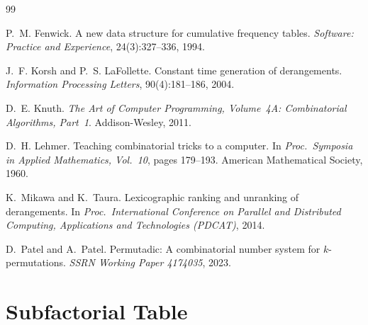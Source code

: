 \documentclass[11pt,a4paper]{article}
\begin{document}
    
    \begin{thebibliography}{99}

        P.~M. Fenwick.
        \newblock A new data structure for cumulative frequency tables.
        \newblock \emph{Software: Practice and Experience}, 24(3):327--336, 1994.

        J.~F. Korsh and P.~S. LaFollette.
        \newblock Constant time generation of derangements.
        \newblock \emph{Information Processing Letters}, 90(4):181--186, 2004.

        D.~E. Knuth.
        \newblock \emph{The Art of Computer Programming, Volume~4A: Combinatorial Algorithms, Part~1}.
        \newblock Addison-Wesley, 2011.

        D.~H. Lehmer.
        \newblock Teaching combinatorial tricks to a computer.
        \newblock In \emph{Proc.\ Symposia in Applied Mathematics, Vol.~10}, pages 179--193.
        \newblock American Mathematical Society, 1960.

        K.~Mikawa and K.~Taura.
        \newblock Lexicographic ranking and unranking of derangements.
        \newblock In \emph{Proc.\ International Conference on Parallel and Distributed
        Computing, Applications and Technologies (PDCAT)}, 2014.

        D.~Patel and A.~Patel.
        \newblock Permutadic: A combinatorial number system for $k$-permutations.
        \newblock \emph{SSRN Working Paper 4174035}, 2023.

    \end{thebibliography}

    \appendix

    \section{Subfactorial Table}
    \label{app:subfact}
\end{document}

